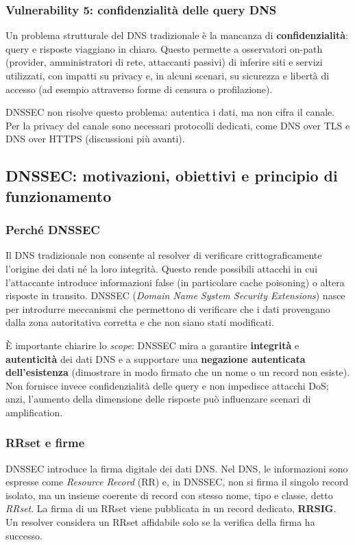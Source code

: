 \subsubsection{Vulnerability 5: confidenzialità delle query DNS}
Un problema strutturale del DNS tradizionale è la mancanza di \textbf{confidenzialità}: query e risposte viaggiano in chiaro. Questo permette a osservatori on-path (provider, amministratori di rete, attaccanti passivi) di inferire siti e servizi utilizzati, con impatti su privacy e, in alcuni scenari, su sicurezza e libertà di accesso (ad esempio attraverso forme di censura o profilazione).

DNSSEC non risolve questo problema: autentica i dati, ma non cifra il canale. Per la privacy del canale sono necessari protocolli dedicati, come DNS over TLS e DNS over HTTPS (discussioni più avanti).

\subsection{DNSSEC: motivazioni, obiettivi e principio di funzionamento}

\subsubsection{Perché DNSSEC}
Il DNS tradizionale non consente al resolver di verificare crittograficamente l’origine dei dati né la loro integrità. Questo rende possibili attacchi in cui l’attaccante introduce informazioni false (in particolare cache poisoning) o altera risposte in transito. DNSSEC (\emph{Domain Name System Security Extensions}) nasce per introdurre meccanismi che permettono di verificare che i dati provengano dalla zona autoritativa corretta e che non siano stati modificati.

È importante chiarire lo \emph{scope}: DNSSEC mira a garantire \textbf{integrità} e \textbf{autenticità} dei dati DNS e a supportare una \textbf{negazione autenticata dell’esistenza} (dimostrare in modo firmato che un nome o un record non esiste). Non fornisce invece confidenzialità delle query e non impedisce attacchi DoS; anzi, l’aumento della dimensione delle risposte può influenzare scenari di amplification.

\subsubsection{RRset e firme}
DNSSEC introduce la firma digitale dei dati DNS. Nel DNS, le informazioni sono espresse come \emph{Resource Record} (RR) e, in DNSSEC, non si firma il singolo record isolato, ma un insieme coerente di record con stesso nome, tipo e classe, detto \emph{RRset}. La firma di un RRset viene pubblicata in un record dedicato, \textbf{RRSIG}. Un resolver considera un RRset affidabile solo se la verifica della firma ha successo.

